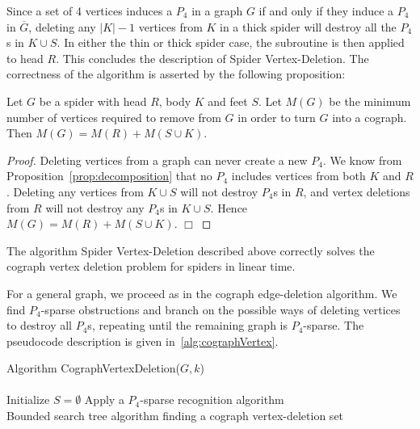 \documentclass{llncs}
\begin{document}
Since a set of 4 vertices induces a $P_4$ in a graph $G$ if and only if they induce a $P_4$ in $\overline{G}$, deleting any $|K|-1$ vertices from $K$ in a thick spider will destroy all the $P_4$s in $K \cup S$. In either the thin or thick spider case, the subroutine is then applied to head $R$. This concludes the description of {\sc Spider Vertex-Deletion}. The correctness of the algorithm is asserted by the following proposition:

\begin{proposition}\label{prop:cographvertex}
Let $G$ be a spider with head $R$, body $K$ and feet $S$. Let $M(G)$ be the minimum number of vertices required to remove from $G$ in order to turn $G$ into a cograph. Then $M(G) = M(R) + M(S \cup K)$.
\end{proposition}

\begin{proof}
  Deleting vertices from a graph can never create a new $P_4$. We know from Proposition~\ref{prop:decomposition} that no $P_4$ includes vertices from both $K$ and $R$. Deleting any vertices from $K\cup S$ will not destroy $P_4$s in $R$, and vertex deletions from $R$ will not destroy any $P_4$s in $K\cup S$. Hence $M(G) = M(R) + M(S \cup K)$.
  \hfill $\Box$
\end{proof}

\begin{corollary}
  The algorithm {\sc Spider Vertex-Deletion} described above correctly solves the cograph vertex deletion problem for spiders in linear time.
\end{corollary}

For a general graph, we proceed as in the cograph edge-deletion algorithm. We find $P_4$-sparse obstructions and branch on the possible ways of deleting vertices to destroy all $P_4$s, repeating until the remaining graph is $P_4$-sparse. The pseudocode description is given in~\ref{alg:cographVertex}.


\begin{algorithm}[H]
\SetAlgoLined Algorithm {\sc CographVertexDeletion($G,k$)}\\
\ \\
Initialize $S = \emptyset$\;
Apply a $P_4$-sparse recognition algorithm\;
\ \\
\caption{Bounded search tree algorithm finding a cograph vertex-deletion set}
\label{alg:cographVertex}
\end{algorithm}
\end{document}
